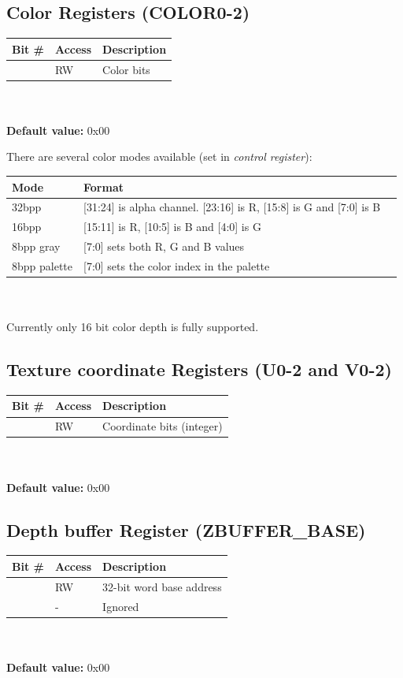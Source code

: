 \documentclass[10pt,a4paper]{article}
\begin{document}
\subsection{Color Registers (COLOR0-2)}
\begin{tabular}{|l|l|l|}
\hline \textbf{Bit \#} & \textbf{Access} & \textbf{Description} \\ 
\hline
\hline [31:0] & RW & Color bits \\
\hline 
\end{tabular}
\\\\
\textbf{Default value:} 0x00

There are several color modes available (set in \textit{control register}):

\begin{tabular}{|l|l|l|}
\hline \textbf{Mode} & \textbf{Format} \\ 
\hline
\hline 32bpp & [31:24] is alpha channel. [23:16] is R, [15:8] is G and [7:0] is B \\
\hline 16bpp & [15:11] is R, [10:5] is B and [4:0] is G\\
\hline 8bpp gray & [7:0] sets both R, G and B values \\
\hline 8bpp palette & [7:0] sets the color index in the palette \\
\hline 
\end{tabular}
\\\\

Currently only 16 bit color depth is fully supported.

\subsection{Texture coordinate Registers (U0-2 and V0-2)}
\begin{tabular}{|l|l|l|}
\hline \textbf{Bit \#} & \textbf{Access} & \textbf{Description} \\ 
\hline
\hline [31:0] & RW & Coordinate bits (integer) \\
\hline 
\end{tabular}
\\\\
\textbf{Default value:} 0x00

\subsection{Depth buffer Register (ZBUFFER\_BASE)}
\begin{tabular}{|l|l|l|}
\hline \textbf{Bit \#} & \textbf{Access} & \textbf{Description} \\ 
\hline
\hline [31:2] & RW & 32-bit word base address \\
\hline [1:0] & - & Ignored \\
\hline 
\end{tabular}
\\\\
\textbf{Default value:} 0x00
\end{document}
